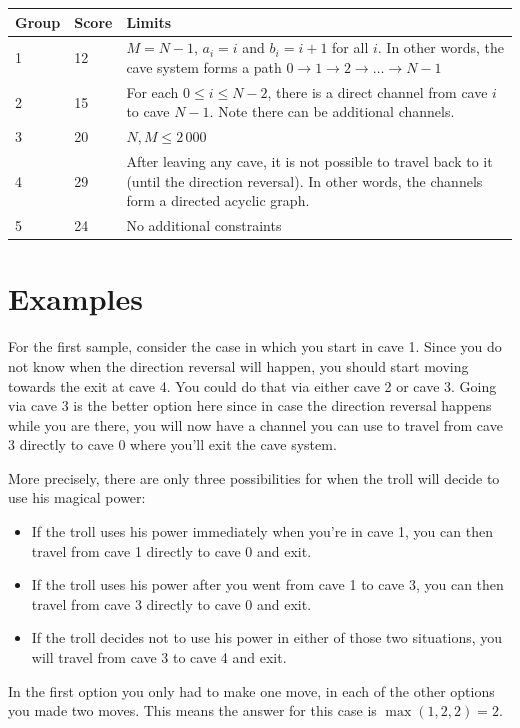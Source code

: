 \begin{tabular}{|l|l|l|}
  \hline
  Group  &  Score  &  Limits \\
  \hline
   1 & 12 & $M=N-1$, $a_i = i$ and $b_i = i + 1$ for all $i$. In other words, the cave system forms a path $0 \rightarrow 1 \rightarrow 2 \rightarrow \ldots \rightarrow N-1$   \\
  \hline
   2 & 15 & For each $0 \le i \le N-2$, there is a direct channel from cave $i$ to cave $N-1$. Note there can be additional channels.  \\
  \hline
   3 & 20 & $N, M \leq 2\,000$ \\
  \hline
   4 & 29 & After leaving any cave, it is not possible to travel back to it (until the direction reversal). In other words, the channels form a directed acyclic graph.\\
  \hline
   5 & 24 & No additional constraints \\
  \hline
\end{tabular}


\section*{Examples}
For the first sample, consider the case in which you start in cave 
1. Since you do not know when the direction reversal will happen, you should start moving towards the exit at cave 4. You could do that via either cave 2 or cave 3. Going via cave 3 is the better option here since in case the direction reversal happens while you are there, you will now have a channel you can use to travel from cave 3 directly to cave 0 where you'll exit the cave system.

More precisely, there are only three possibilities for when the troll will decide to use his magical power:

\begin{itemize}
\item If the troll uses his power immediately when you're in cave 1, you can then travel from cave 1 directly to cave 0 and exit.
\item If the troll uses his power after you went from cave 1 to cave 3, you can then travel from cave 3 directly to cave 0 and exit.
\item If the troll decides not to use his power in either of those two situations, you will travel from cave 3 to cave 4 and exit.
\end{itemize}

In the first option you only had to make one move, in each of the other options you made two moves. This means the answer for this case is $\max(1,2,2) = 2$.

